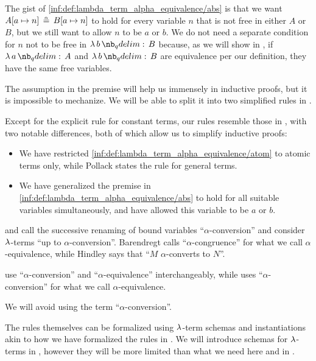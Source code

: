 \begin{comments}
  \item The gist of \ref{inf:def:lambda_term_alpha_equivalence/abs} is that we want \( A[a \mapsto n] \aequiv B[a \mapsto n] \) to hold for every variable \( n \) that is not free in either \( A \) or \( B \), but we still want to allow \( n \) to be \( a \) or \( b \). We do not need a separate condition for \( n \) not to be free in \( \qabs b B \) because, as we will show in , if \( \qabs a A \) and \( \qabs b B \) are equivalence per our definition, they have the same free variables.

  The assumption in the premise will help us immensely in inductive proofs, but it is impossible to mechanize. We will be able to split it into two simplified rules in .

  \item Except for the explicit rule for constant terms, our rules resemble those in \cite[5]{Pollack2005AlphaConversion}, with two notable differences, both of which allow us to simplify inductive proofs:
  \begin{itemize}
    \item We have restricted \ref{inf:def:lambda_term_alpha_equivalence/atom} to atomic terms only, while Pollack states the rule for general terms.
    \item We have generalized the premise in \ref{inf:def:lambda_term_alpha_equivalence/abs} to hold for all suitable variables simultaneously, and have allowed this variable to be \( a \) or \( b \).
  \end{itemize}

  \item {} and  call the successive renaming of bound variables \enquote{\( \alpha \)-conversion} and consider \( \mathrm{\lambda} \)-terms \enquote{up to \( \alpha \)-conversion}. Barendregt calls \enquote{\( \alpha \)-congruence} for what we call \( \alpha \)-equivalence, while Hindley says that \enquote{\( M \) \( \alpha \)-converts to \( N \)}.

   use \enquote{\( \alpha \)-conversion} and \enquote{\( \alpha \)-equivalence} interchangeably, while  uses \enquote{\( \alpha \)-conversion} for what we call \( \alpha \)-equivalence.

  We will avoid using the term \enquote{\( \alpha \)-conversion}.

  \item The rules themselves can be formalized using \( \mathrm{\lambda} \)-term schemas and instantiations akin to how we have formalized the rules in . We will introduce schemas for \( \mathrm{\lambda} \)-terms in , however they will be more limited than what we need here and in .
\end{comments}

